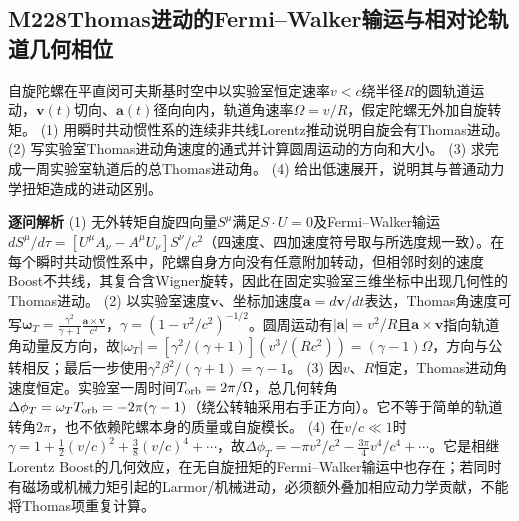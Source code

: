 \subsection*{M228\quad Thomas进动的Fermi–Walker输运与相对论轨道几何相位}
自旋陀螺在平直闵可夫斯基时空中以实验室恒定速率$v<c$绕半径$R$的圆轨道运动，$\boldsymbol v(t)$切向、$\boldsymbol a(t)$径向向内，轨道角速率$\Omega=v/R$，假定陀螺无外加自旋转矩。
(1) 用瞬时共动惯性系的连续非共线Lorentz推动说明自旋会有Thomas进动。
(2) 写实验室Thomas进动角速度的通式并计算圆周运动的方向和大小。
(3) 求完成一周实验室轨道后的总Thomas进动角。
(4) 给出低速展开，说明其与普通动力学扭矩造成的进动区别。
\par\textbf{逐问解析}
(1) 无外转矩自旋四向量$S^\mu$满足$S\cdot U=0$及Fermi–Walker输运$dS^\mu/d\tau=[U^\mu A_\nu-A^\mu U_\nu]S^\nu/c^2$（四速度、四加速度符号取与所选度规一致）。在每个瞬时共动惯性系中，陀螺自身方向没有任意附加转动，但相邻时刻的速度Boost不共线，其复合含Wigner旋转，因此在固定实验室三维坐标中出现几何性的Thomas进动。
(2) 以实验室速度$\boldsymbol v$、坐标加速度$\boldsymbol a=d\boldsymbol v/dt$表达，Thomas角速度可写$\boldsymbol\omega_T=\frac{\gamma^2}{\gamma+1}\frac{\boldsymbol a\times\boldsymbol v}{c^2}$，$\gamma=(1-v^2/c^2)^{-1/2}$。圆周运动有$|\boldsymbol a|=v^2/R$且$\boldsymbol a\times\boldsymbol v$指向轨道角动量反方向，故$|\omega_T|=[\gamma^2/(\gamma+1)](v^3/(Rc^2))=(\gamma-1)\Omega$，方向与公转相反；最后一步使用$\gamma^2\beta^2/(\gamma+1)=\gamma-1$。
(3) 因$v$、$R$恒定，Thomas进动角速度恒定。实验室一周时间$T_{\rm orb}=2\pi/\Omega$，总几何转角$\Delta\phi_T=\omega_T T_{\rm orb}=-2\pi(\gamma-1)$（绕公转轴采用右手正方向）。它不等于简单的轨道转角$2\pi$，也不依赖陀螺本身的质量或自旋模长。
(4) 在$v/c\ll1$时$\gamma=1+\frac12(v/c)^2+\frac38(v/c)^4+\cdots$，故$\Delta\phi_T=-\pi v^2/c^2-\frac{3\pi}{4}v^4/c^4+\cdots$。它是相继Lorentz Boost的几何效应，在无自旋扭矩的Fermi–Walker输运中也存在；若同时有磁场或机械力矩引起的Larmor/机械进动，必须额外叠加相应动力学贡献，不能将Thomas项重复计算。
\par\medskip
